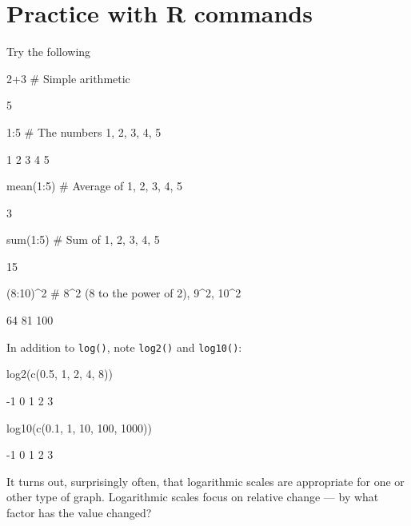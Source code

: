 \documentclass{tufte-book}\usepackage[]{graphicx}\usepackage[]{color}
\newcommand{\txtt}[1]{\texttt{#1}}
\begin{document}
\section{Practice with R commands}
Try the following
\begin{Schunk}
\begin{Sinput}
2+3        # Simple arithmetic
\end{Sinput}
\begin{Soutput}
[1] 5
\end{Soutput}
\begin{Sinput}
1:5        # The numbers 1, 2, 3, 4, 5
\end{Sinput}
\begin{Soutput}
[1] 1 2 3 4 5
\end{Soutput}
\begin{Sinput}
mean(1:5)  # Average of 1, 2, 3, 4, 5
\end{Sinput}
\begin{Soutput}
[1] 3
\end{Soutput}
\begin{Sinput}
sum(1:5)   # Sum of 1, 2, 3, 4, 5
\end{Sinput}
\begin{Soutput}
[1] 15
\end{Soutput}
\begin{Sinput}
(8:10)^2   # 8^2 (8 to the power of 2), 9^2, 10^2
\end{Sinput}
\begin{Soutput}
[1]  64  81 100
\end{Soutput}
\end{Schunk}

In addition to \txtt{log()}, note \txtt{log2()} and \txtt{log10()}:
\begin{Schunk}
\begin{Sinput}
log2(c(0.5, 1, 2, 4, 8))
\end{Sinput}
\begin{Soutput}
[1] -1  0  1  2  3
\end{Soutput}
\begin{Sinput}
log10(c(0.1, 1, 10, 100, 1000))
\end{Sinput}
\begin{Soutput}
[1] -1  0  1  2  3
\end{Soutput}
\end{Schunk}
\noindent
It turns out, surprisingly often, that logarithmic scales are
appropriate for one or other type of graph.  Logarithmic scales focus
on relative change --- by what factor has the value changed?
\end{document}
